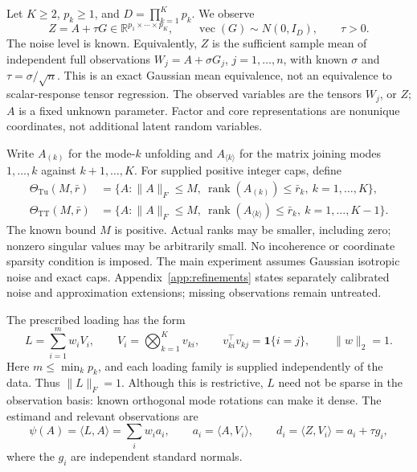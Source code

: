 \documentclass[11pt]{article}
\theoremstyle{remark}
\newcommand{\R}{\mathbb R}
\newcommand{\ip}[2]{\langle #1,#2\rangle}
\newcommand{\norm}[1]{\lVert #1\rVert}
\newcommand{\rank}{\operatorname{rank}}
\newcommand{\Tu}{\mathrm{Tu}}
\newcommand{\TT}{\mathrm{TT}}
\begin{document}
Let $K\ge2$, $p_k\ge1$, and $D=\prod_{k=1}^K p_k$. We observe
\begin{equation}\label{eq:model}
 Z=A+\tau G\in\R^{p_1\times\cdots\times p_K},\qquad
 \operatorname{vec}(G)\sim N(0,I_D),\qquad \tau>0.
\end{equation}
The noise level is known. Equivalently, $Z$ is the sufficient sample mean of independent full observations $W_j=A+\sigma G_j$, $j=1,\ldots,n$, with known $\sigma$ and $\tau=\sigma/\sqrt n$. This is an exact Gaussian mean equivalence, not an equivalence to scalar-response tensor regression. The observed variables are the tensors $W_j$, or $Z$; $A$ is a fixed unknown parameter. Factor and core representations are nonunique coordinates, not additional latent random variables.

Write $A_{(k)}$ for the mode-$k$ unfolding and $A_{\langle k\rangle}$ for the matrix joining modes $1,\ldots,k$ against $k+1,\ldots,K$. For supplied positive integer caps, define
\begin{align}
 \Theta_{\Tu}(M,\bar r)&=\{A:\norm A_F\le M,\ \rank(A_{(k)})\le\bar r_k,\ k=1,\ldots,K\},\label{eq:tucker}\\
 \Theta_{\TT}(M,\bar r)&=\{A:\norm A_F\le M,\ \rank(A_{\langle k\rangle})\le\bar r_k,\ k=1,\ldots,K-1\}.\label{eq:tt}
\end{align}
The known bound $M$ is positive. Actual ranks may be smaller, including zero; nonzero singular values may be arbitrarily small. No incoherence or coordinate sparsity condition is imposed. The main experiment assumes Gaussian isotropic noise and exact caps. Appendix~\ref{app:refinements} states separately calibrated noise and approximation extensions; missing observations remain untreated.

The prescribed loading has the form
\begin{equation}\label{eq:loading}
 L=\sum_{i=1}^m w_i V_i,\qquad
 V_i=\bigotimes_{k=1}^K v_{ki},\qquad
 v_{ki}^\top v_{kj}=\mathbf1\{i=j\},\qquad \norm w_2=1.
\end{equation}
Here $m\le\min_k p_k$, and each loading family is supplied independently of the data. Thus $\norm L_F=1$. Although this is restrictive, $L$ need not be sparse in the observation basis: known orthogonal mode rotations can make it dense. The estimand and relevant observations are
\begin{equation}\label{eq:diagonal}
 \psi(A)=\ip LA=\sum_iw_i a_i,\qquad
 a_i=\ip A{V_i},\qquad d_i=\ip Z{V_i}=a_i+\tau g_i,
\end{equation}
where the $g_i$ are independent standard normals.
\end{document}
